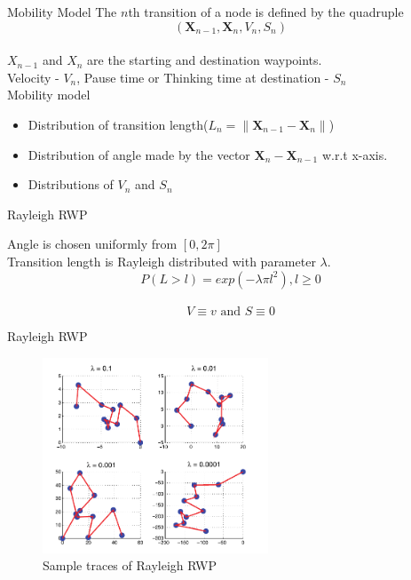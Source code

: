 \documentclass{beamer}
\begin{document}
\begin{frame}{Mobility Model} %
The $n$th transition of a node is defined by the quadruple \\

\begin{equation*}
(\mathbf{X}_{n-1},\mathbf{X}_n, V_n, S_n) 
\end{equation*}
\mbox{} \\
$X_{n-1}$ and $X_n$ are the starting and destination waypoints. \\
\vspace{0.5cm}
Velocity - $V_n$, Pause time or Thinking time at destination - $S_n$ \\
\vspace{1cm}
\pause
Mobility model
\begin{itemize}
\item Distribution of transition length($L_n = \|\mathbf{X}_{n-1} - \mathbf{X}_n \|$)
\item Distribution of angle made by the vector $\mathbf{X}_n - \mathbf{X}_{n-1}$ w.r.t x-axis. 
\item Distributions of $V_n$ and $S_n$
\end{itemize}
\end{frame}

\begin{frame}{Rayleigh RWP}

Angle is chosen uniformly from $[0,2\pi]$ \\
\vspace{1cm}
Transition length is Rayleigh distributed with parameter $\lambda$. 
\begin{equation*}
	P(L > l) = exp(-\lambda \pi l^2), l \geq 0
\end{equation*}
\mbox{} \\
\begin{equation*}
V \equiv v \text{ and } S \equiv 0
\end{equation*}
\end{frame}

\begin{frame}{Rayleigh RWP }
\begin{figure}[h]
    \centering \vspace{-0.1in}
    \includegraphics[width=0.6\textwidth]{images/rwpTraces.png}
     \caption[Sample traces of rayleigh RWP mobility model]{\small Sample traces of Rayleigh RWP\footnotemark}
\end{figure}
\end{frame}
\end{document}
